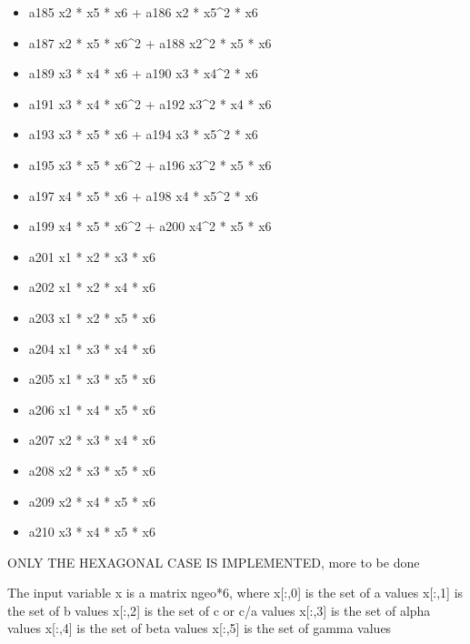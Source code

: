 \documentclass[letterpaper,10pt,english]{sphinxmanual}
\begin{document}
\begin{fulllineitems}
\begin{description}
\begin{itemize}
\item {} 
a185 x2 * x5 * x6 + a186 x2 * x5\textasciicircum{}2 * x6

\item {} 
a187 x2 * x5 * x6\textasciicircum{}2 + a188 x2\textasciicircum{}2 * x5 * x6

\item {} 
a189 x3 * x4 * x6 + a190 x3 * x4\textasciicircum{}2 * x6

\item {} 
a191 x3 * x4 * x6\textasciicircum{}2 + a192 x3\textasciicircum{}2 * x4 * x6

\item {} 
a193 x3 * x5 * x6 + a194 x3 * x5\textasciicircum{}2 * x6

\item {} 
a195 x3 * x5 * x6\textasciicircum{}2 + a196 x3\textasciicircum{}2 * x5 * x6

\item {} 
a197 x4 * x5 * x6 + a198 x4 * x5\textasciicircum{}2 * x6

\item {} 
a199 x4 * x5 * x6\textasciicircum{}2 + a200 x4\textasciicircum{}2 * x5 * x6

\item {} 
a201 x1 * x2 * x3 * x6

\item {} 
a202 x1 * x2 * x4 * x6

\item {} 
a203 x1 * x2 * x5 * x6

\item {} 
a204 x1 * x3 * x4 * x6

\item {} 
a205 x1 * x3 * x5 * x6

\item {} 
a206 x1 * x4 * x5 * x6

\item {} 
a207 x2 * x3 * x4 * x6

\item {} 
a208 x2 * x3 * x5 * x6

\item {} 
a209 x2 * x4 * x5 * x6

\item {} 
a210 x3 * x4 * x5 * x6

\end{itemize}

\end{description}

ONLY THE HEXAGONAL CASE IS IMPLEMENTED, more to be done

The input variable x is a matrix ngeo*6, where
x{[}:,0{]} is the set of a values  
x{[}:,1{]} is the set of b values  
x{[}:,2{]} is the set of c or c/a values  
x{[}:,3{]} is the set of alpha values  
x{[}:,4{]} is the set of beta values   
x{[}:,5{]} is the set of gamma values

\end{fulllineitems}
\end{document}
